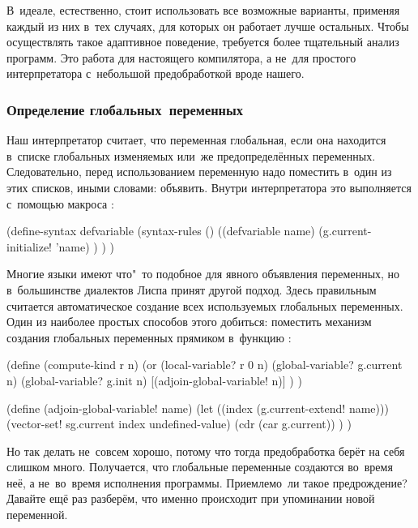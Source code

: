 В~идеале, естественно, стоит использовать все возможные варианты, применяя
каждый из них в~тех случаях, для которых он работает лучше остальных. Чтобы
осуществлять такое адаптивное поведение, требуется более тщательный анализ
программ. Это работа для настоящего компилятора, а не~для простого
интерпретатора с~небольшой предобработкой вроде нашего.


\subsubsection{Определение глобальных~переменных}%
\label{fast/fast/variations/ssect:global-define}

Наш интерпретатор считает, что переменная глобальная, если она находится
в~списке глобальных изменяемых или~же предопределённых переменных.
Следовательно, перед использованием переменную надо поместить в~один из этих
списков, иными словами: объявить. Внутри интерпретатора это выполняется
с~помощью макроса :

\begin{code:lisp}
(define-syntax defvariable
  (syntax-rules ()
    ((defvariable name)
     (g.current-initialize! 'name) ) ) )
\end{code:lisp}

Многие языки имеют что"~то подобное для явного объявления переменных, но
в~большинстве диалектов Лиспа принят другой подход. Здесь правильным считается
автоматическое создание всех используемых глобальных переменных. Один из
наиболее простых способов этого добиться: поместить механизм создания глобальных
переменных прямиком в~функцию :

\begin{code:lisp}
(define (compute-kind r n)
  (or (local-variable? r 0 n)
      (global-variable? g.current n)
      (global-variable? g.init n)
      [(adjoin-global-variable! n)] ) )

(define (adjoin-global-variable! name)
  (let ((index (g.current-extend! name)))
    (vector-set! sg.current index undefined-value)
    (cdr (car g.current)) ) )
\end{code:lisp}

Но так делать не~совсем хорошо, потому что тогда предобработка берёт на себя
слишком много. Получается, что глобальные переменные создаются во~время неё, а
не~во~время исполнения программы. Приемлемо~ли такое предрождение? Давайте ещё
раз разберём, что именно происходит при упоминании новой переменной.


